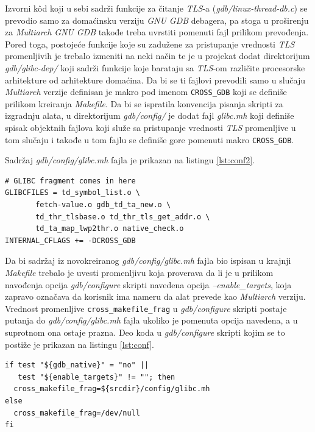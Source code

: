 \documentclass[12pt,oneside]{memoir}
\begin{document}
Izvorni k\^{o}d koji u sebi sadrži funkcije za čitanje \emph{TLS}-a (\emph{gdb/linux-thread-db.c}) se prevodio samo za domaćinsku verziju \emph{GNU GDB} debagera, pa stoga u proširenju za \emph{Multiarch} \emph{GNU GDB} takođe treba uvrstiti pomenuti fajl prilikom prevođenja. Pored toga, postojeće funkcije koje su zadužene za pristupanje vrednosti \emph{TLS} promenljivih je trebalo izmeniti na neki način te je u projekat dodat direktorijum \emph{gdb/glibc-dep/} koji sadrži funkcije koje barataju sa \emph{TLS}-om različite procesorske arhitekture od arhitekture domaćina. Da bi se ti fajlovi prevodili samo u slučaju \emph{Multiarch} verzije definisan je makro pod imenom \texttt{CROSS\_GDB} koji se definiše prilikom kreiranja \emph{Makefile}. Da bi se ispratila konvencija pisanja skripti za izgradnju alata, u direktorijum \emph{gdb/config/} je dodat fajl \emph{glibc.mh} koji definiše spisak objektnih fajlova koji služe sa pristupanje vrednosti \emph{TLS} promenljive u tom slučaju i takođe u tom fajlu se definiše gore pomenuti makro \texttt{CROSS\_GDB}.

Sadržaj \emph{gdb/config/glibc.mh} fajla je prikazan na listingu \ref{lst:conf2}.
\begin{lstlisting}[label={lst:conf2}, caption={Sadržaj \emph{gdb/config/glibc.mh} fajla.}]
# GLIBC fragment comes in here
GLIBCFILES = td_symbol_list.o \
       fetch-value.o gdb_td_ta_new.o \
       td_thr_tlsbase.o td_thr_tls_get_addr.o \
       td_ta_map_lwp2thr.o native_check.o
INTERNAL_CFLAGS += -DCROSS_GDB
\end{lstlisting}

Da bi sadržaj iz novokreiranog \emph{gdb/config/glibc.mh} fajla bio ispisan u krajnji \emph{Makefile} trebalo je uvesti promenljivu koja proverava da li je u prilikom navođenja opcija \emph{gdb/configure} skripti navedena opcija \emph{--enable\_targets}, koja zapravo označava da korisnik ima nameru da alat prevede kao \emph{Multiarch} verziju. Vrednost promenljive \texttt{cross\_makefile\_frag} u \emph{gdb/configure} skripti postaje putanja do \emph{gdb/config/glibc.mh} fajla ukoliko je pomenuta opcija navedena, a u suprotnom ona ostaje prazna.\newpage
Deo koda u \emph{gdb/configure} skripti kojim se to postiže je prikazan na listingu \ref{lst:conf}.
\begin{lstlisting}[label={lst:conf}, caption={Izmena \emph{gdb/configure} fajla.}]
if test "${gdb_native}" = "no" ||
   test "${enable_targets}" != ""; then
  cross_makefile_frag=${srcdir}/config/glibc.mh
else
  cross_makefile_frag=/dev/null
fi
\end{lstlisting}
\end{document}
